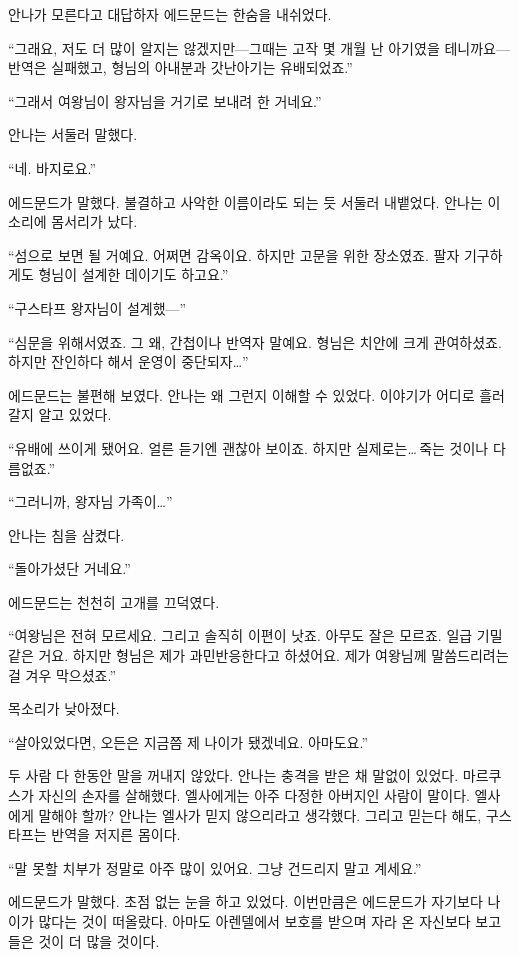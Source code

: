 안나가 모른다고 대답하자 에드문드는 한숨을 내쉬었다.

``그래요, 저도 더 많이 알지는 않겠지만—그때는 고작 몇 개월 난 아기였을 테니까요—반역은 실패했고, 형님의 아내분과 갓난아기는 유배되었죠.''

``그래서 여왕님이 왕자님을 거기로 보내려 한 거네요.''

안나는 서둘러 말했다.

``네. 바지로요.''

에드문드가 말했다. 불결하고 사악한 이름이라도 되는 듯 서둘러 내뱉었다. 안나는 이 소리에 몸서리가 났다.

``섬으로 보면 될 거예요. 어쩌면 감옥이요. 하지만 고문을 위한 장소였죠. 팔자 기구하게도 형님이 설계한 데이기도 하고요.''

``구스타프 왕자님이 설계했—''

``심문을 위해서였죠. 그 왜, 간첩이나 반역자 말예요. 형님은 치안에 크게 관여하셨죠. 하지만 잔인하다 해서 운영이 중단되자\ldots''

에드문드는 불편해 보였다. 안나는 왜 그런지 이해할 수 있었다. 이야기가 어디로 흘러갈지 알고 있었다.

``유배에 쓰이게 됐어요. 얼른 듣기엔 괜찮아 보이죠. 하지만 실제로는\ldots\,죽는 것이나 다름없죠.''

``그러니까, 왕자님 가족이\ldots''

안나는 침을 삼켰다.

``돌아가셨단 거네요.''

에드문드는 천천히 고개를 끄덕였다.

``여왕님은 전혀 모르세요. 그리고 솔직히 이편이 낫죠. 아무도 잘은 모르죠. 일급 기밀 같은 거요. 하지만 형님은 제가 과민반응한다고 하셨어요. 제가 여왕님께 말씀드리려는 걸 겨우 막으셨죠.''

목소리가 낮아졌다.

``살아있었다면, 오든은 지금쯤 제 나이가 됐겠네요. 아마도요.''

두 사람 다 한동안 말을 꺼내지 않았다. 안나는 충격을 받은 채 말없이 있었다. 마르쿠스가 자신의 손자를 살해했다. 엘사에게는 아주 다정한 아버지인 사람이 말이다. 엘사에게 말해야 할까? 안나는 엘사가 믿지 않으리라고 생각했다. 그리고 믿는다 해도, 구스타프는 반역을 저지른 몸이다.

``말 못할 치부가 정말로 아주 많이 있어요. 그냥 건드리지 말고 계세요.''

에드문드가 말했다. 초점 없는 눈을 하고 있었다. 이번만큼은 에드문드가 자기보다 나이가 많다는 것이 떠올랐다. 아마도 아렌델에서 보호를 받으며 자라 온 자신보다 보고 들은 것이 더 많을 것이다.

